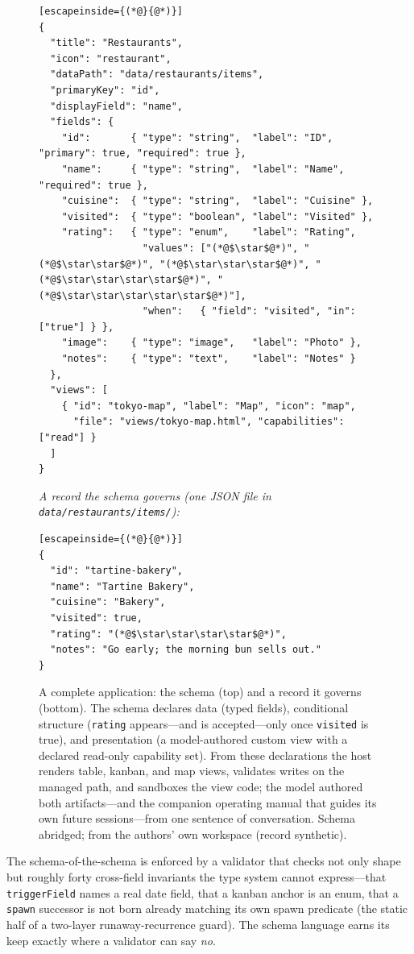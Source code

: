 \documentclass[11pt]{article}
\newcommand{\code}[1]{\texttt{\small #1}}
\begin{document}
\begin{figure}[!tp]
\begin{lstlisting}[escapeinside={(*@}{@*)}]
{
  "title": "Restaurants",
  "icon": "restaurant",
  "dataPath": "data/restaurants/items",
  "primaryKey": "id",
  "displayField": "name",
  "fields": {
    "id":       { "type": "string",  "label": "ID", "primary": true, "required": true },
    "name":     { "type": "string",  "label": "Name", "required": true },
    "cuisine":  { "type": "string",  "label": "Cuisine" },
    "visited":  { "type": "boolean", "label": "Visited" },
    "rating":   { "type": "enum",    "label": "Rating",
                  "values": ["(*@$\star$@*)", "(*@$\star\star$@*)", "(*@$\star\star\star$@*)", "(*@$\star\star\star\star$@*)", "(*@$\star\star\star\star\star$@*)"],
                  "when":   { "field": "visited", "in": ["true"] } },
    "image":    { "type": "image",   "label": "Photo" },
    "notes":    { "type": "text",    "label": "Notes" }
  },
  "views": [
    { "id": "tokyo-map", "label": "Map", "icon": "map",
      "file": "views/tokyo-map.html", "capabilities": ["read"] }
  ]
}
\end{lstlisting}
\vspace{-0.5em}
{\footnotesize\itshape A record the schema governs (one JSON file in
\code{data/restaurants/items/}):}
\begin{lstlisting}[escapeinside={(*@}{@*)}]
{
  "id": "tartine-bakery",
  "name": "Tartine Bakery",
  "cuisine": "Bakery",
  "visited": true,
  "rating": "(*@$\star\star\star\star$@*)",
  "notes": "Go early; the morning bun sells out."
}
\end{lstlisting}
\caption{A complete application: the schema (top) and a record it governs
(bottom). The schema declares data (typed fields), conditional structure
(\code{rating} appears---and is accepted---only once \code{visited} is true), and
presentation (a model-authored custom view with a declared read-only capability
set). From these declarations the host renders table, kanban, and map views,
validates writes on the managed path, and sandboxes the view code; the model
authored both artifacts---and the companion operating manual that guides its own
future sessions---from one sentence of conversation. Schema abridged; from the
authors' own workspace (record synthetic).}
\label{fig:schema}
\end{figure}

The schema-of-the-schema is enforced by a validator that checks not only shape
but roughly forty cross-field invariants the type system cannot express---that
\code{triggerField} names a real date field, that a kanban anchor is an enum,
that a \code{spawn} successor is not born already matching its own spawn
predicate (the static half of a two-layer runaway-recurrence guard). The schema
language earns its keep exactly where a validator can say \emph{no}.
\end{document}
